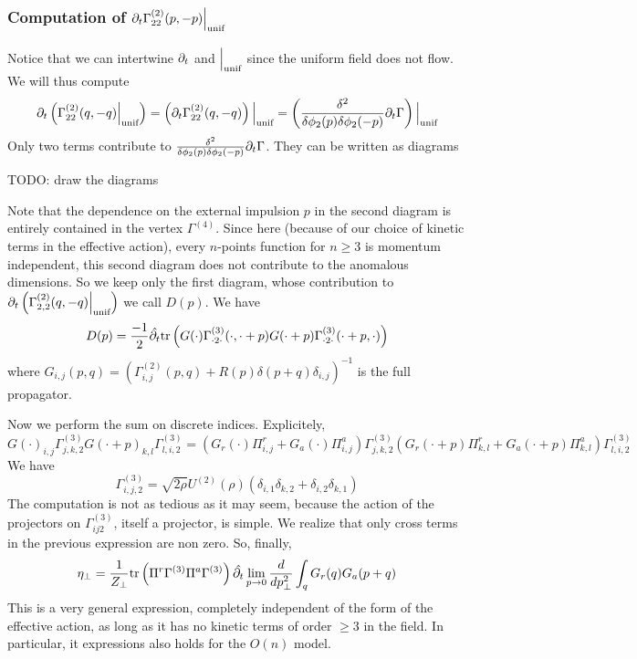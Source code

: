 \subsubsection{Computation of $\partial_{t} \Gamma^{(2)}_{22}(p,-p)  \Big|_{\text{unif}} $}
Notice that we can intertwine $\partial_{t}$ and $ \Big|_{\text{unif}} $ since the uniform field does not flow. We will thus compute
\begin{equation}
\partial_{t} \left ( \Gamma^{(2)}_{22}(q,-q)  \Big|_{\text{unif}}  \right ) = \left ( \partial_{t} \Gamma^{(2)}_{22}(q,-q)  \right ) \Big|_{\text{unif}}   = \left( \frac{\delta^2}{\delta \phi_2(p) \delta \phi_2(-p)} \partial_{t} \Gamma \right)  \Big|_{\text{unif}} 
\end{equation}
Only two terms contribute to $\frac{\delta^2}{\delta \phi_2(p) \delta \phi_2(-p)} \partial_{t} \Gamma$. They can be written as diagrams

TODO: draw the diagrams

Note that the dependence on the external impulsion $p$ in the second diagram is entirely contained in the vertex $\Gamma^{(4)}$. Since here (because of our choice of kinetic terms in the effective action), every $n$-points function for $n \geq 3$ is momentum independent, this second diagram does not contribute to the anomalous dimensions.
So we keep only the first diagram, whose contribution to $\partial_{t} \left ( \Gamma^{(2)}_{2,2}(q,-q)  \Big|_{\text{unif}}  \right )$  we call $D(p)$. We have
\begin{equation}
D(p) = \frac{-1}{2} \hat{\partial_{t}}  \text{tr}\left( G(\cdot)\Gamma^{(3)}_{\cdot 2 \cdot}(\cdot, \cdot + p) G(\cdot + p) \Gamma^{(3)}_{\cdot 2 \cdot}(\cdot + p, \cdot) \right) 
\end{equation}
where $G_{i,j}(p,q) = \left ( \Gamma^{(2)}_{i,j}(p,q) + R(p)\delta(p+q)\delta_{i,j} \right )^{-1}$ is the full propagator.

Now we perform the sum on discrete indices. Explicitely,
\begin{equation}
G(\cdot)_{i,j} \Gamma^{(3)}_{j,k,2} G(\cdot + p)_{k,l} \Gamma^{(3)}_{l,i,2}  = \left(G_r(\cdot) \Pi^r_{i,j}+ G_a(\cdot) \Pi^a_{i,j} \right) \Gamma^{(3)}_{j,k,2} \left(G_r(\cdot+p) \Pi^r_{k,l}+ G_a(\cdot+p)\Pi^a_{k,l}\right) \Gamma^{(3)}_{l,i,2} 
\end{equation}
We have
\begin{equation}
\Gamma^{(3)}_{i,j,2} = \sqrt{2 \rho} U^{(2)}(\rho) \left( \delta_{i,1}\delta_{k,2} + \delta_{i,2}\delta_{k,1} \right)
\end{equation}
The computation is not as tedious as it may seem, because the action of the projectors on $\Gamma^{(3)}_{ij2}$, itself a projector, is simple. We realize that only cross terms in the previous expression are non zero.
So, finally,
\begin{align}
\eta_\perp = \frac{1}{Z_\perp}  \text{tr}\left(\Pi^r \Gamma^{(3)} \Pi^a \Gamma^{(3)}\right)  \hat{\partial_{t}} \lim_{p \rightarrow 0} \frac{d}{dp^2_\perp} \int_q G_r(q) G_a(p+q)
\end{align}
This is a very general expression, completely independent of the form of the effective action, as long as it has no kinetic terms of order $\geq 3$ in the field. In particular, it expressions also holds for the $O(n)$ model.


